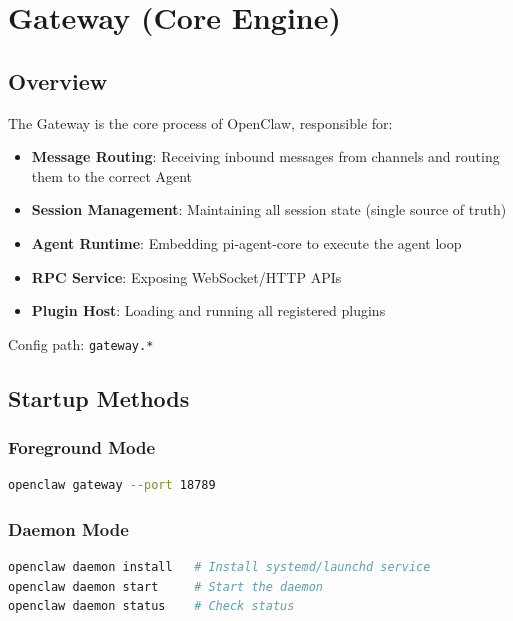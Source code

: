 \chapter{Gateway (Core Engine)}

\section{Overview}

The Gateway is the core process of OpenClaw, responsible for:

\begin{itemize}
  \item \textbf{Message Routing}: Receiving inbound messages from channels and routing them to the correct Agent
  \item \textbf{Session Management}: Maintaining all session state (single source of truth)
  \item \textbf{Agent Runtime}: Embedding pi-agent-core to execute the agent loop
  \item \textbf{RPC Service}: Exposing WebSocket/HTTP APIs
  \item \textbf{Plugin Host}: Loading and running all registered plugins
\end{itemize}

Config path: \texttt{gateway.*}

\section{Startup Methods}

\subsection{Foreground Mode}

\begin{lstlisting}[language=bash]
openclaw gateway --port 18789
\end{lstlisting}

\subsection{Daemon Mode}

\begin{lstlisting}[language=bash]
openclaw daemon install   # Install systemd/launchd service
openclaw daemon start     # Start the daemon
openclaw daemon status    # Check status
\end{lstlisting}

